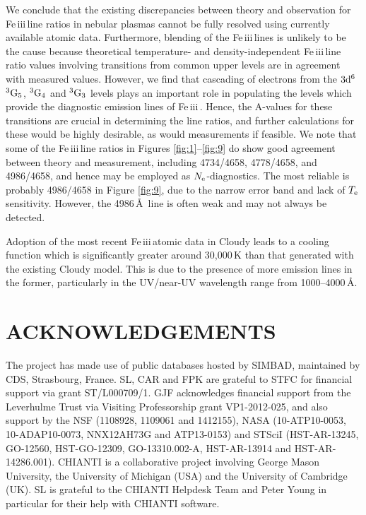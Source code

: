\documentclass{emulateapj}
\newcommand\fe{Fe\,{\sc iii}\,}
\begin{document}
We conclude that the existing discrepancies between theory and observation for \fe line ratios in nebular plasmas 
cannot be fully resolved using currently available atomic data. Furthermore, blending 
of the \fe lines is unlikely to be the cause because theoretical temperature- and density-independent \fe line ratio values involving
transitions from common upper levels are in agreement with measured values. However, we find that 
cascading of electrons from the $\rm 3d^6$ $\rm ^3G_5$, $\rm ^3G_4$ and $\rm ^3G_3$ levels plays an important role in populating the levels which provide the diagnostic emission lines of \fe. Hence, the A-values for these transitions are crucial in determining the line ratios, and further calculations for these would be highly desirable, as would measurements if feasible. We note that some of the \fe line ratios in Figures \ref{fig:1}--\ref{fig:9} do show good agreement between theory and measurement, including 4734/4658, 4778/4658, and 4986/4658, and hence may be employed as $N_{\rm e}$-diagnostics. The most reliable is probably 4986/4658 in Figure \ref{fig:9}, due to the narrow error band and lack of $T_{\rm e}$ sensitivity. However, the 4986\,\AA\ line is often weak and may not always be detected. 

Adoption of the most recent \fe atomic data in Cloudy leads to a cooling function which is significantly greater around 30,000\,K
than that generated with the existing Cloudy model. This is due to the presence of more emission lines in the former,
particularly in the UV/near-UV wavelength range from 1000--4000\,\AA. 






\section*{ACKNOWLEDGEMENTS}

 The project has made use of public databases hosted by SIMBAD, maintained by CDS, Strasbourg, France. SL, CAR and FPK are grateful to STFC for financial support via grant ST/L000709/1. GJF acknowledges financial support from the Leverhulme Trust via Visiting Professorship grant VP1-2012-025, and also support by the NSF (1108928, 1109061 and 1412155), NASA (10-ATP10-0053, 10-ADAP10-0073, NNX12AH73G and ATP13-0153) and STSciI (HST-AR-13245, GO-12560, HST-GO-12309, GO-13310.002-A, HST-AR-13914 and HST-AR-14286.001). CHIANTI is a collaborative project involving George Mason University, the University of Michigan (USA) and the University of Cambridge (UK). 
 SL is grateful to the CHIANTI Helpdesk Team and Peter Young in particular for their help with CHIANTI software.
\end{document}
